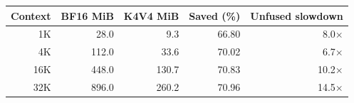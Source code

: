 \begin{tabular}{rrrrr}
\toprule
Context & BF16 MiB & K4V4 MiB & Saved (\%) & Unfused slowdown \\
\midrule
1K & 28.0 & 9.3 & 66.80 & 8.0$\times$ \\
4K & 112.0 & 33.6 & 70.02 & 6.7$\times$ \\
16K & 448.0 & 130.7 & 70.83 & 10.2$\times$ \\
32K & 896.0 & 260.2 & 70.96 & 14.5$\times$ \\
\bottomrule
\end{tabular}
